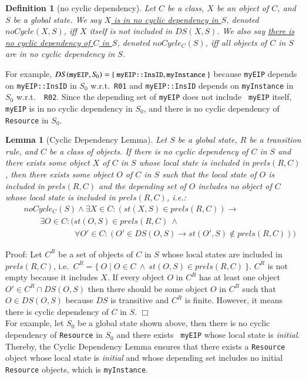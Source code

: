\documentclass[12pt]{report}
\newtheorem{lemma}{Lemma}
\newtheorem{definition}{Definition}
\newcommand{\ra}{\rightarrow}
\newcommand{\mbstt}[1]{\mbox{\small{\tt {#1}}}}
\newcommand{\stt}[1]{{\small{\tt {#1}}}}
\newcommand{\ul}{\underline}
\begin{document}
\begin{definition}[no cyclic dependency]
Let $C$ be a class, $X$ be an object of $C$, and $S$ be a global
state. We say \ul{$X$ is in no cyclic dependency in $S$}, denoted
\ul{$noCycle(X,S)$}, iff $X$ itself is not included in $DS(X,S)$. We
also say \ul{there is no cyclic dependency of $C$ in $S$}, denoted
\ul{$noCycle_C(S)$}, iff all objects of $C$ in $S$ are in no cyclic
dependency in $S$.
\end{definition}
For example, $DS(\mbstt{myEIP},S\!_0) =
\{~\mbstt{myEIP::InsID},\mbstt{myInstance}~\}$ because {\tt myEIP}
depends on \stt{myEIP::InsID} in $S\!_0$ w.r.t.\ {\tt R01} and
\stt{myEIP::InsID} depends on {\tt myInstance} in $S\!_0$ w.r.t.\ {\tt
  R02}. Since the depending set of {\tt myEIP} does not include {\tt
  myEIP} itself, {\tt myEIP} is in no cyclic dependency in $S\!_0$, and
there is no cyclic dependency of {\tt Resource} in $S\!_0$.
\begin{lemma}[Cyclic Dependency Lemma]
Let $S$ be a global state, $R$ be a transition rule, and $C$ be a
class of objects. If there is no cyclic dependency of $C$ in $S$
and there exists some object $X$ of $C$ in $S$ whose local state
is included in $prels(R,C)$, then there exists some object $O$ of $C$ in
$S$ such that the local state of $O$ is included in $prels(R,C)$ and the
depending set of $O$ includes no object of $C$ whose local
state is included in $prels(R,C)$, i.e.:
\begin{eqnarray*}
&&noCycle_C(S)\land\exists X\in C:(st(X,S)\in prels(R,C)) \ra\\
&&\:\:\:\:\:\:\:\:\:\exists O\in C:(st(O,S)\in prels(R,C)\ \land\\
&&\:\:\:\:\:\:\:\:\:\:\:\:\:\:\:\:\:\:\:\:\:\:\:\:\:\:\:\:
\forall O'\in C:(O'\in DS(O,S)\ra st(O',S)\not\in prels(R,C)))
\end{eqnarray*}
\end{lemma}
Proof: Let $C^R$ be a set of objects of $C$ in $S$ whose local states
are included in $prels(R,C)$, i.e.\ $C^R=\{~O\mid O\in C~\land~
st(O,S)\in prels(R,C)~\}$. $C^R$ is not empty because it includes $X$.
If every object $O$ in $C^R$ has at least one object $O' \in C^R\cap
DS(O,S)$ then there should be some object $O$ in $C^R$ such that $O
\in DS(O,S)$ because $DS$ is transitive and $C^R$ is finite. However,
it means there is cyclic dependency of $C$ in $S$. $\Box$\\

\noindent
For example, let $S\!_0$ be a global state shown above, then there is no
cyclic dependency of {\tt Resource} in $S\!_0$ and there exists {\tt
  myEIP} whose local state is {\it initial}. Thereby, the Cyclic
Dependency Lemma ensures that there exists a {\tt Resource} object
whose local state is {\it initial} and whose depending set includes no
initial {\tt Resource} objects, which is {\tt myInstance}.
\end{document}

